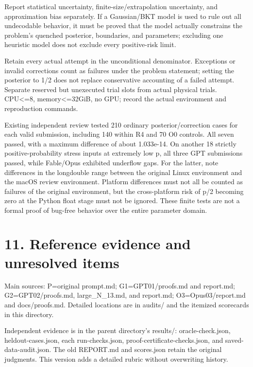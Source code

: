 \documentclass[11pt,a4paper]{article}
\begin{document}
Report statistical uncertainty, finite-size/\allowbreak{}extrapolation uncertainty, and approximation bias separately. If a Gaussian/\allowbreak{}BKT model is used to rule out all undecodable behavior, it must be proved that the model actually constrains the problem's quenched posterior, boundaries, and parameters; excluding one heuristic model does not exclude every positive-risk limit.

Retain every actual attempt in the unconditional denominator. Exceptions or invalid corrections count as failures under the problem statement; setting the posterior to 1/\allowbreak{}2 does not replace conservative accounting of a failed attempt. Separate reserved but unexecuted trial slots from actual physical trials. CPU<=8, memory<=32GiB, no GPU; record the actual environment and reproduction commands.

Existing independent review tested 210 ordinary posterior/\allowbreak{}correction cases for each valid submission, including 140 within R4 and 70 O0 controls. All seven passed, with a maximum difference of about 1.033e-14. On another 18 strictly positive-probability stress inputs at extremely low p, all three GPT submissions passed, while Fable/\allowbreak{}Opus exhibited underflow gaps. For the latter, note differences in the longdouble range between the original Linux environment and the macOS review environment. Platform differences must not all be counted as failures of the original environment, but the cross-platform risk of p/\allowbreak{}2 becoming zero at the Python float stage must not be ignored. These finite tests are not a formal proof of bug-free behavior over the entire parameter domain.

\section*{11. Reference evidence and unresolved items}

Main sources: P=original prompt.md; G1=GPT01/\allowbreak{}proofs.md and report.md; G2=GPT02/\allowbreak{}proofs.md, large\_N\_13.md, and report.md; O3=Opus03/\allowbreak{}report.md and docs/\allowbreak{}proofs.md. Detailed locations are in audits/\allowbreak{} and the itemized scorecards in this directory.

Independent evidence is in the parent directory's results/\allowbreak{}: oracle-check.json, heldout-cases.json, each run-checks.json, proof-certificate-checks.json, and saved-data-audit.json. The old REPORT.md and scores.json retain the original judgments. This version adds a detailed rubric without overwriting history.
\end{document}
